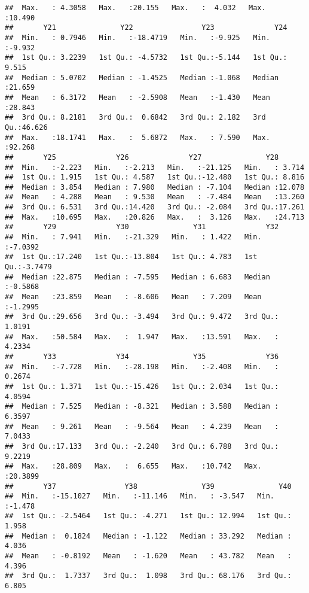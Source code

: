 \documentclass[
]{article}
\begin{document}
\begin{verbatim}
##  Max.   : 4.3058   Max.   :20.155   Max.   :  4.032   Max.   :10.490  
##       Y21               Y22                Y23              Y24        
##  Min.   : 0.7946   Min.   :-18.4719   Min.   :-9.925   Min.   :-9.932  
##  1st Qu.: 3.2239   1st Qu.: -4.5732   1st Qu.:-5.144   1st Qu.: 9.515  
##  Median : 5.0702   Median : -1.4525   Median :-1.068   Median :21.659  
##  Mean   : 6.3172   Mean   : -2.5908   Mean   :-1.430   Mean   :28.843  
##  3rd Qu.: 8.2181   3rd Qu.:  0.6842   3rd Qu.: 2.182   3rd Qu.:46.626  
##  Max.   :18.1741   Max.   :  5.6872   Max.   : 7.590   Max.   :92.268  
##       Y25              Y26              Y27               Y28        
##  Min.   :-2.223   Min.   :-2.213   Min.   :-21.125   Min.   : 3.714  
##  1st Qu.: 1.915   1st Qu.: 4.587   1st Qu.:-12.480   1st Qu.: 8.816  
##  Median : 3.854   Median : 7.980   Median : -7.104   Median :12.078  
##  Mean   : 4.288   Mean   : 9.530   Mean   : -7.484   Mean   :13.260  
##  3rd Qu.: 6.531   3rd Qu.:14.420   3rd Qu.: -2.084   3rd Qu.:17.261  
##  Max.   :10.695   Max.   :20.826   Max.   :  3.126   Max.   :24.713  
##       Y29              Y30               Y31              Y32         
##  Min.   : 7.941   Min.   :-21.329   Min.   : 1.422   Min.   :-7.0392  
##  1st Qu.:17.240   1st Qu.:-13.804   1st Qu.: 4.783   1st Qu.:-3.7479  
##  Median :22.875   Median : -7.595   Median : 6.683   Median :-0.5868  
##  Mean   :23.859   Mean   : -8.606   Mean   : 7.209   Mean   :-1.2995  
##  3rd Qu.:29.656   3rd Qu.: -3.494   3rd Qu.: 9.472   3rd Qu.: 1.0191  
##  Max.   :50.584   Max.   :  1.947   Max.   :13.591   Max.   : 4.2334  
##       Y33              Y34               Y35              Y36         
##  Min.   :-7.728   Min.   :-28.198   Min.   :-2.408   Min.   : 0.2674  
##  1st Qu.: 1.371   1st Qu.:-15.426   1st Qu.: 2.034   1st Qu.: 4.0594  
##  Median : 7.525   Median : -8.321   Median : 3.588   Median : 6.3597  
##  Mean   : 9.261   Mean   : -9.564   Mean   : 4.239   Mean   : 7.0433  
##  3rd Qu.:17.133   3rd Qu.: -2.240   3rd Qu.: 6.788   3rd Qu.: 9.2219  
##  Max.   :28.809   Max.   :  6.655   Max.   :10.742   Max.   :20.3899  
##       Y37                Y38               Y39               Y40        
##  Min.   :-15.1027   Min.   :-11.146   Min.   : -3.547   Min.   :-1.478  
##  1st Qu.: -2.5464   1st Qu.: -4.271   1st Qu.: 12.994   1st Qu.: 1.958  
##  Median :  0.1824   Median : -1.122   Median : 33.292   Median : 4.036  
##  Mean   : -0.8192   Mean   : -1.620   Mean   : 43.782   Mean   : 4.396  
##  3rd Qu.:  1.7337   3rd Qu.:  1.098   3rd Qu.: 68.176   3rd Qu.: 6.805  

\end{verbatim}
\end{document}
